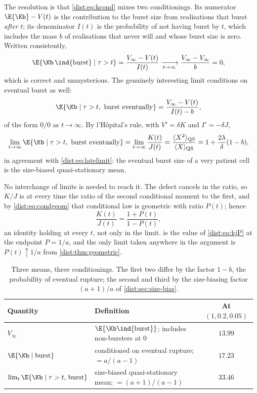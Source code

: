 The resolution is that \cref{dist:eq:kcond} mixes two conditionings. Its
numerator $\E{\Kb}-V(t)$ is the contribution to the burst size from
realisations that burst \emph{after} $t$; its denominator $I(t)$ is the
probability of not having burst by $t$, which includes the mass $b$ of
realisations that never will and whose burst size is zero. Written
consistently,
\begin{equation}
\E{\Kb\,\ind\{\text{burst}\}\mid\tau>t}
=\frac{V_\infty-V(t)}{I(t)}
\xrightarrow[t\to\infty]{}\frac{V_\infty-V_\infty}{b}=0,
\label{dist:eq:consistent}
\end{equation}
which is correct and unmysterious. The genuinely interesting limit conditions
on eventual burst as well:
\begin{equation}
\E{\Kb\mid \tau>t,\ \text{burst eventually}}
=\frac{V_\infty-V(t)}{I(t)-b},
\label{dist:eq:patient}
\end{equation}
of the form $0/0$ as $t\to\infty$. By l'H\^opital's rule, with $V'=\delta K$
and $I'=-\delta J$,
\begin{equation}
\lim_{t\to\infty}\E{\Kb\mid \tau>t,\ \text{burst eventually}}
=\lim_{t\to\infty}\frac{K(t)}{J(t)}
=\frac{\langle X^2\rangle_{\rm QS}}{\langle X\rangle_{\rm QS}}
=1+\frac{2\lambda}{\delta}(1-b),
\label{dist:eq:latemean}
\end{equation}
in agreement with \cref{dist:eq:latelimit}: the eventual burst size of a very
patient cell is the size-biased quasi-stationary mean.

No interchange of limits is needed to reach it. The defect cancels in the
ratio, so $K/J$ is at every time the ratio of the second conditional moment to
the first, and by \cref{dist:eq:condgeom} that conditional law is geometric
with ratio $P(t)$; hence
\begin{equation}
\frac{K(t)}{J(t)}=\frac{1+P(t)}{1-P(t)},
\label{dist:eq:kjP}
\end{equation}
an identity holding at every $t$, not only in the limit.
 is the value of \cref{dist:eq:kjP} at the endpoint
$P=1/a$, and the only limit taken anywhere in the argument is
$P(t)\uparrow1/a$ from \cref{dist:thm:geometric}.

\begin{table}[tbp]
\centering
\renewcommand{\arraystretch}{1.35}
\small
\begin{tabular}{@{}llc@{}}
\toprule
Quantity & Definition & At $(1,0.2,0.05)$ \\
\midrule
$V_\infty$ & $\E{\Kb\ind\{\text{burst}\}}$; includes non-bursters at $0$ & $13.99$ \\
$\E{\Kb\mid\text{burst}}$ & conditioned on eventual rupture; $=a/(a-1)$ & $17.23$ \\
$\lim_t\E{\Kb\mid\tau>t,\,\text{burst}}$ & size-biased quasi-stationary mean; $=(a{+}1)/(a{-}1)$ & $33.46$ \\
\bottomrule
\end{tabular}
\caption{Three means, three conditionings. The first two differ by the factor
$1-b$, the probability of eventual rupture; the second and third by the
size-biasing factor $(a+1)/a$ of \cref{dist:sec:size-bias}.}
\label{dist:tab:threemeans}
\end{table}

